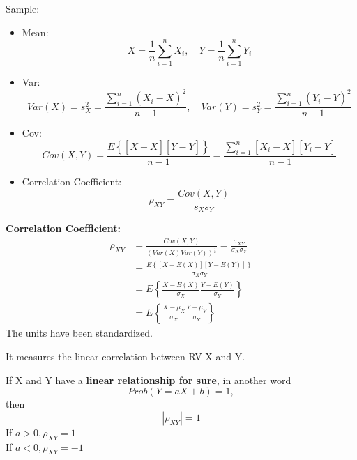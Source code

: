 \documentclass[12pt]{article}
\begin{document}
Sample:
\begin{itemize}
\item Mean:
\begin{equation*}
 \overline{X} = \frac{1}{n}\sum\limits_{i = 1} ^n X_{i}, \quad	
\overline{Y} = \frac{1}{n}\sum\limits_{i = 1} ^n Y_{i}
\end{equation*}

\item Var:
		\begin{equation*}
		Var(X) =s_{X}^{2} =  \frac{\sum\limits_{i = 1} ^n (X_{i} -  \overline{X})^{2}	}{n - 1}, \quad
    Var(Y) =s_{Y}^{2} =  \frac{\sum\limits_{i = 1} ^n (Y_{i} -  \overline{Y})^{2}	}{n - 1}
		\end{equation*}
\item Cov:
		\begin{equation*}
				Cov(X,Y) = \frac{E \left\{ [X -  \overline{X}][Y -  \overline{Y}] \right\} }{n - 1}
				= \frac{\sum\limits_{i = 1} ^n [X_{i} -  \overline{X}][Y_{i} -  \overline{Y}]	}{n - 1}
		\end{equation*}
\item Correlation Coefficient:
		\begin{equation*}
		\rho_{XY} = \frac{Cov(X,Y)}{s_{X}s_{Y}}
		\end{equation*}

\end{itemize}









{\textbf {Correlation Coefficient:}}
\begin{align*}
		\rho_{XY} &= \frac{Cov(X,Y)}{(Var(X)Var(Y))^{\frac{1}{2}}} = 
		\frac{\sigma_{XY}}{\sigma_{X}\sigma_{Y}} \\
		&= \frac{E \left\{ [X - E(X)][Y - E(Y)] \right\}}{\sigma_{X}\sigma_{Y}} \\
		&= E \left\{ \frac{X - E(X)}{\sigma_{X}} \frac{Y - E(Y)}{\sigma_{Y}} \right\} \\
		&= E \left\{ \frac{X - \mu_{X}}{\sigma_{X}} \frac{Y - \mu_{Y}}{\sigma_{Y}} \right\} 
\end{align*}
The units have been standardized.

It measures the linear correlation between RV X and Y.

If X and Y have a {\textbf {linear relationship for sure}}, in another word
\begin{equation*}
Prob(Y = aX + b) = 1,
\end{equation*}
then 
\begin{equation*}
\left\lvert \rho_{XY} \right\rvert  = 1
\end{equation*}
If $ a > 0 , \rho_{XY} = 1$\\
If $ a < 0 , \rho_{XY} = -1$\\
\end{document}
